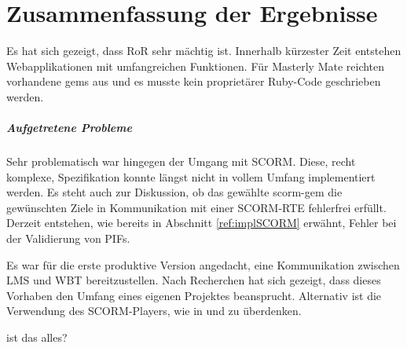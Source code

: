 \chapter{Zusammenfassung der Ergebnisse}\label{ref:chaptConclusion}
Es hat sich gezeigt, dass \ac{RoR} sehr mächtig ist. Innerhalb kürzester Zeit
entstehen Webapplikationen mit umfangreichen Funktionen. Für Masterly Mate
reichten vorhandene gems aus und es musste kein proprietärer Ruby-Code
geschrieben werden.

\paragraph{Aufgetretene Probleme}\label{ref:problems}
Sehr problematisch war hingegen der Umgang mit SCORM. Diese, recht komplexe,
Spezifikation konnte längst nicht in vollem Umfang implementiert werden. Es
steht auch zur Diskussion, ob das gewählte scorm-gem die gewünschten Ziele in
Kommunikation mit einer SCORM-RTE fehlerfrei erfüllt. Derzeit entstehen, wie
bereits in Abschnitt \ref{ref:implSCORM} erwähnt, Fehler bei der Validierung von
PIFs.

Es war für die erste produktive Version angedacht, eine Kommunikation zwischen
\ac{LMS} und \ac{WBT} bereitzustellen. Nach Recherchen hat sich gezeigt, dass
dieses Vorhaben den Umfang eines eigenen Projektes beansprucht. Alternativ ist
die Verwendung des SCORM-Players, wie in \cite{mitter:2005} und
\cite{knall:2005} zu überdenken.

\begin{k}
ist das alles?
\end{k}